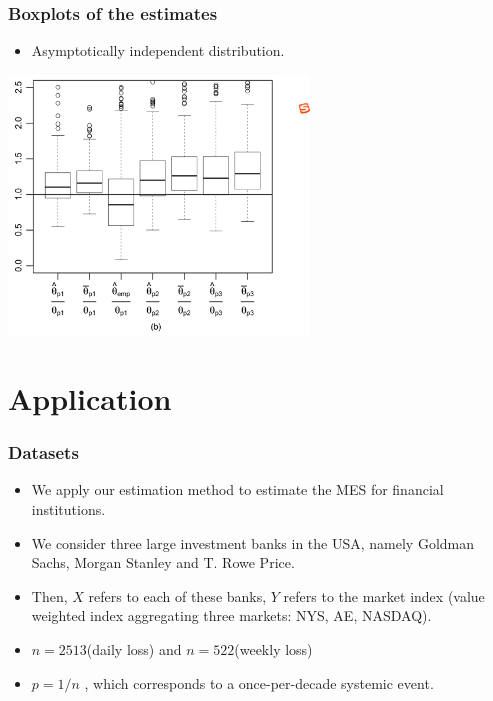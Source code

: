 \documentclass{beamer}
\begin{document}
\begin{frame}
    \frametitle{Boxplots of the estimates}
\begin{itemize}
    \item Asymptotically independent distribution.
\end{itemize}

\includegraphics[width=0.6\textwidth]{2_b.png}


\end{frame}

\section{Application}

\begin{frame}
    \frametitle{Datasets}
\begin{itemize}
    \item We apply our estimation method to estimate the MES for financial institutions.
    \item We consider three large investment banks in the USA, namely Goldman Sachs, Morgan Stanley and T. Rowe Price. 
    \item Then, $X$ refers to each of these banks, $Y$ refers to the market index (value weighted index aggregating three markets: NYS, AE, NASDAQ).
    \item $n=2513$(daily loss) and $n=522$(weekly loss)
    \item  
    $p=1/n$ , which corresponds to a once-per-decade systemic event.
\end{itemize}
    
 


    

\end{frame}
\end{document}
